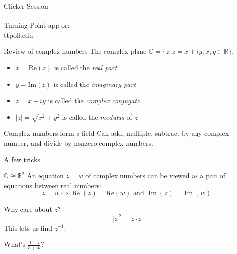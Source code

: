 \documentclass{beamer}
\newcommand{\C}{\mathbb{C}}
\newcommand{\R}{\mathbb{R}}
\DeclareMathOperator{\Real}{Re}
\DeclareMathOperator{\Imag}{Im}
\begin{document}
\begin{frame}[plain,c]

\begin{center}

\Huge

Clicker Session \\
\\
Turning Point app or:
\\
ttpoll.edu 

\end{center}





\end{frame}

\begin{frame}{Review of complex numbers}
  The complex plane $\C=\{z: z=x+iy; x,y\in\R\}$.
  \begin{itemize}
  \item $x=\text{Re}(z)$ is called the \emph{real part} 
  \item $y=\text{Im}(z)$ is called the \emph{imaginary part} 
  \item $\overline{z}=x-iy$ is called the \emph{complex conjugate} 
  \item $|z|=\sqrt{x^2+y^2}$ is called the \emph{modulus} of $z$

  \end{itemize}
  \begin{block}{Complex numbers form a field}
Can add, multiple, subtract by any complex number, and divide by nonzero complex numbers.
\end{block}

\end{frame}

\begin{frame}{A few tricks}
  \begin{block}{$\C\cong\R^2$}
    An equation $z=w$ of complex numbers can be viewed as a pair of equations between real numbers:
$$z=w \iff  \Real(z)=\text{Re}(w) \text{ and } \Imag(z)=\Imag(w)$$
  \end{block}

  \begin{block}{Why care about $\overline{z}$?}
    $$|z|^2=z\cdot \overline{z}$$
    This lets us find $z^{-1}$.
\end{block}
  \begin{example}What's $\frac{1-i}{3+4i}$?

    \end{example}

\end{frame}
\end{document}
